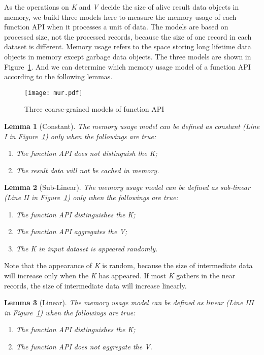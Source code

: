 As the operations on \textit{K} and \textit{V} decide the size of alive result data objects in memory, we build three models here to measure the memory usage of each function API when it processes a unit of data. The models are based on processed size, not the processed records, because the size of one record in each dataset is different. Memory usage refers to the space storing long lifetime data objects in memory except garbage data objects. The three models are shown in Figure~\ref{fig:mur}. And we can determine which memory usage model of a function API according to the following lemmas.

\begin{figure}[!t]
\centering
\texttt{[image: mur.pdf]}
\caption{Three coarse-grained models of function API}
\label{fig:mur}
\end{figure}

\newtheorem{lemma}{Lemma}
\begin{lemma}[Constant] The memory usage model can be defined as constant (Line I in Figure~\ref{fig:mur}) only when the followings are true:
\begin{enumerate}
\item The function API does not distinguish the \textit{K};
\item The result data will not be cached in memory.
\end{enumerate}
\end{lemma}

\begin{lemma}[Sub-Linear] The memory usage model can be defined as sub-linear (Line II in Figure~\ref{fig:mur}) only when the followings are true:
\begin{enumerate}
\item The function API distinguishes the \textit{K};
\item The function API aggregates the \textit{V};
\item The \textit{K} in input dataset is appeared randomly.
\end{enumerate}
\end{lemma}

Note that the appearance of \textit{K} is random, because the size of intermediate data will increase only when the \textit{K} has appeared. If most \textit{K} gathers in the near records, the size of intermediate data will increase linearly.

\begin{lemma}[Linear] The memory usage model can be defined as linear (Line III in Figure~\ref{fig:mur}) when the followings are true:
\begin{enumerate}
\item The function API distinguishes the \textit{K};
\item The function API does not aggregate the \textit{V}.
\end{enumerate}
\end{lemma}

